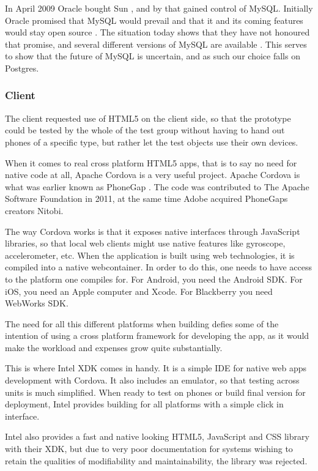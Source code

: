 \documentclass[11pt]{book}
\begin{document}
In April 2009 Oracle bought Sun \cite{sun}, and by that gained control of MySQL. Initially Oracle promised that MySQL would prevail and that it and its coming features would stay open source \cite{mysql}. The situation today shows that they have not honoured that promise, and several different versions of MySQL are available \cite{mysqlproducts}. This serves to show that the future of MySQL is uncertain, and as such our choice falls on Postgres.

\subsubsection{Client}
The client requested use of HTML5 on the client side, so that the prototype could be tested by the whole of the test group without having to hand out phones of a specific type, but rather let the test objects use their own devices.

When it comes to real cross platform HTML5 apps, that is to say no need for native code at all, Apache Cordova is a very useful project. Apache Cordova is what was earlier known as PhoneGap \cite{phonegap}. The code was contributed to The Apache Software Foundation in 2011, at the same time Adobe acquired PhoneGaps creators Nitobi.

The way Cordova works is that it exposes native interfaces through JavaScript libraries, so that local web clients might use native features like gyroscope, accelerometer, etc. When the application is built using web technologies, it is compiled into a native webcontainer. In order to do this, one needs to have access to the platform one compiles for. For Android, you need the Android SDK. For iOS, you need an Apple computer and Xcode. For Blackberry you need WebWorks SDK.

The need for all this different platforms when building defies some of the intention of using a cross platform framework for developing the app, as it would make the workload and expenses grow quite substantially.

This is where Intel XDK comes in handy. It is a simple IDE for native web apps development with Cordova. It also includes an emulator, so that testing across units is much simplified. When ready to test on phones or build final version for deployment, Intel provides building for all platforms with a simple click in interface.

Intel also provides a fast and native looking HTML5, JavaScript and CSS library with their XDK, but due to very poor documentation for systems wishing to retain the qualities of modifiability and maintainability, the library was rejected.
\end{document}
